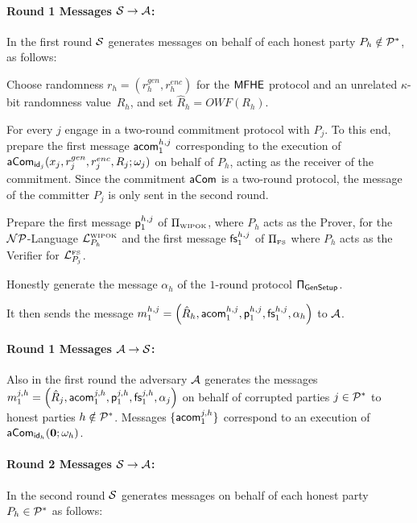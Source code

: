 \paragraph{Round 1 Messages ${\cal S} \rightarrow {\cal A}$:} In the first round ${\cal S}$ generates messages on behalf of each honest party $P_h \notin {\cal P}^*$, as follows:

\BE
\item Choose randomness $r_h=(r^{gen}_h,r^{enc}_h)$ for the ${\mathsf{MFHE}}$ protocol and an unrelated $\kappa$-bit randomness value~$R_h$, and set $\hat{R}_h=OWF(R_h)$.

\item For every $j$ engage in a two-round commitment protocol with $P_j$. To this end, prepare the first message $\mathsf{acom}_1^{h,j}$ corresponding to the execution of $\mathsf{aCom}_{\mathsf{id}_j}(x_j,r^{gen}_j,r^{enc}_j,R_j;\omega_{j})$ on behalf of $P_h$, acting as the receiver of the commitment.  Since the commitment $\mathsf{aCom}$ is a two-round protocol, the message of the committer $P_j$ is only sent in the second round. 

\item Prepare the first message $\mathsf{p}^{h,j}_1$ of $\Pi_{\scriptscriptstyle\mathrm{WIPOK}}$, where $P_h$ acts as the Prover, for the ${{\cal NP}}$-Language ${{\cal L}^{\scriptscriptstyle\mathrm{WIPOK}}_{P_h}}$ and the first message $\mathsf{fs}^{h,j}_1$ of $\Pi_{\scriptscriptstyle\mathrm{FS}}$ where $P_h$ acts as the Verifier for ${{{\mathsf{{\cal L}}}^{{\scriptscriptstyle\mathrm{FS}}}_{P_j}}}$. 

\item Honestly generate the message $\alpha_h$ of the $1$-round protocol $\sf \Pi_{GenSetup}$.

\item It then sends the message $m^{h,j}_1=\left(\hat{R}_h, \mathsf{acom}_1^{h,j}, \mathsf{p}_1^{h,j},\mathsf{fs}_1^{h,j},\alpha_h\right)$
 to ${\cal A}$.
\EE

     
     

\paragraph{Round 1 Messages ${\cal A} \rightarrow {\cal S}$:} Also in the first round the adversary ${\cal A}$ generates the messages $m^{j,h}_1=\left(\hat{R}_j, \mathsf{acom}_1^{j,h}, \mathsf{p}_1^{j,h},\mathsf{fs}_1^{j,h},\alpha_j\right)$ on behalf of corrupted parties $j\in{\cal P}^*$ to honest parties $h\notin{\cal P}^*$. Messages $\{\mathsf{acom}_1^{j,h}\}$ correspond to an execution of $\mathsf{aCom}_{\mathsf{id}_h}({\bf 0};\omega_{h})$.



\paragraph{Round 2 Messages ${\cal S} \rightarrow {\cal A}$:}  In the second round ${\cal S}$ generates messages on behalf of each honest party $P_h\in {\cal P}^*$ as follows:

